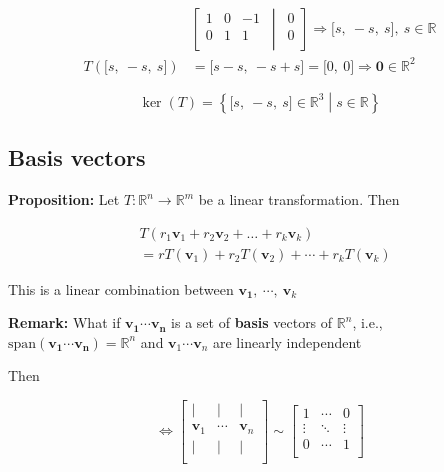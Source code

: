 \documentclass[
]{article}
\begin{document}
\begin{align*}
&\left\lbrack \begin{matrix}
1 & 0 & - 1 \\
0 & 1 & 1 \\
\end{matrix}\, \middle| \,\begin{matrix}
0 \\
0 \\
\end{matrix} \right\rbrack \Rightarrow \lbrack s,\  - s,\ s\rbrack,\ s\mathbb{\in R}
 \\
T\left( \lbrack s,\  - s,\ s\rbrack \right) &= \lbrack s - s,\  - s + s\rbrack = \lbrack 0,\ 0\rbrack \Rightarrow \mathbf{0} \in \mathbb{R}^{2}
\end{align*}


$$\ker{(T)} = \left\{ \lbrack s,\  - s,\ s\rbrack \in \mathbb{R}^{3} \middle| s\mathbb{\in R} \right\}$$


\subsection{Basis vectors}

\textbf{Proposition:} Let
$T:\mathbb{R}^{n} \rightarrow \mathbb{R}^{m}$ be a linear
transformation. Then

\begin{align*}
&T\left( r_{1}{\mathbf{v}}_{1} + r_{2}{\mathbf{v}}_{2} + \ldots + r_{k}{\mathbf{v}}_{k} \right)
 \\
&= rT\left( {\mathbf{v}}_{1} \right) + r_{2}T\left( {\mathbf{v}}_{2} \right) + \cdots + r_{k}T\left( {\mathbf{v}}_{k} \right)
\end{align*}


This is a linear combination between
$\mathbf{v_{1}},\ \cdots,\ {\mathbf{v}}_{k}$

\textbf{Remark:} What if $\mathbf{v_{1}}\cdots\mathbf{v_{n}}$
is a set of \textbf{basis} vectors of $\mathbb{R}^{n}$, i.e.,
$\text{span}\left( \mathbf{v_{1}}\cdots\mathbf{v_{n}} \right) = \mathbb{R}^{n}$
and ${\mathbf{v}}_{1}\cdots{\mathbf{v}}_{n}$ are linearly
independent

Then

$$\Leftrightarrow \begin{bmatrix}
| & | & | \\
{\mathbf{v}}_{1} & \cdots & {\mathbf{v}}_{n} \\
| & | & | \\
\end{bmatrix}\sim\begin{bmatrix}
1 & \cdots & 0 \\
 \vdots & \ddots & \vdots \\
0 & \cdots & 1 \\
\end{bmatrix}$$
\end{document}
